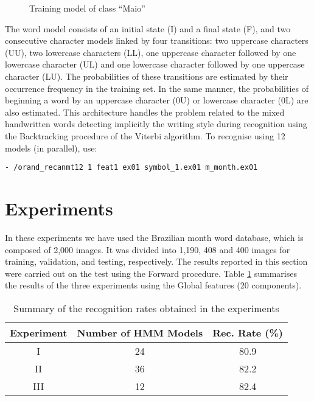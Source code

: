 \documentclass{article}[14pt, oneside, a4paper, times]
\begin{document}
\begin{figure}[htbp]
   \centering
   \caption{Training model of class ``Maio''}
   \label{paralel-models:fig}
\end{figure}
 
The word model consists of an initial state (I) and a final state (F), and two consecutive character models linked by four transitions: two uppercase characters (UU), two lowercase characters (LL), one uppercase character followed by one lowercase character (UL) and one lowercase character followed by one uppercase character (LU). The probabilities of these transitions are estimated by their occurrence frequency in the training set. In the same manner, the probabilities of beginning a word by an uppercase character (0U) or lowercase character (0L) are also estimated. This architecture handles the problem related to the mixed handwritten words detecting implicitly the writing style during recognition using the Backtracking procedure of the Viterbi algorithm. To recognise using 12 models (in parallel), use:
\begin{verbatim}
- /orand_recanmt12 1 feat1 ex01 symbol_1.ex01 m_month.ex01
\end{verbatim}


\section{Experiments}
\label{experiments:sec}
In these experiments we have used the Brazilian month word database, which is composed of 2,000 images. It was divided into 1,190, 408 and 400 images for training, validation, and testing, respectively. The results reported in this section were carried out on the test using the Forward procedure. Table \ref{results:tab} summarises the results of the three experiments using the Global features (20 components).



\begin{table} [ht!]
\caption {Summary of the recognition rates obtained in the experiments}
\begin{center}
\begin{tabular}{ccc} \hline 
 \multicolumn{1}{c}{Experiment}&
 \multicolumn{1}{c}{Number of HMM Models} &
 \multicolumn{1}{c}{Rec. Rate (\%)} \\ \hline

I & 24 & 80.9 \\
II & 36 & 82.2 \\
III & 12 & 82.4 \\ \hline


\end{tabular}
\label{results:tab}
\end{center}
\end{table}
\end{document}
